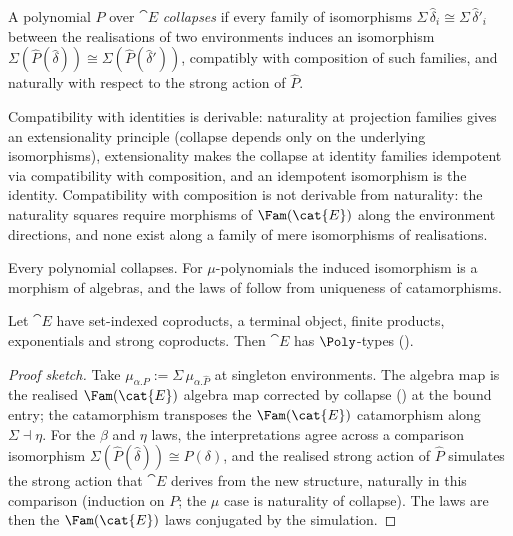 \begin{definition}[Collapse]
\label{def:conservativity:collapse}
A polynomial $P$ over $\cat{E}$ \emph{collapses} if every family of isomorphisms $\Sigma\,
\hat{\delta}_i \cong \Sigma\, \hat{\delta}'_i$ between the realisations of two environments
induces an isomorphism $\Sigma(\hat{P}(\hat{\delta})) \cong \Sigma(\hat{P}(\hat{\delta}'))$,
compatibly with composition of such families, and naturally with respect to the strong action of
$\hat{P}$.
\end{definition}

\begin{remark}
Compatibility with identities is derivable: naturality at projection families gives an
extensionality principle (collapse depends only on the underlying isomorphisms), extensionality
makes the collapse at identity families idempotent via compatibility with composition, and an
idempotent isomorphism is the identity. Compatibility with composition is not derivable from
naturality: the naturality squares require morphisms of $\Fam(\cat{E})$ along the environment
directions, and none exist along a family of mere isomorphisms of realisations.
\end{remark}

\begin{lemma}
\label{lem:conservativity:collapse}
Every polynomial collapses. For $\mu$-polynomials the induced isomorphism is a morphism of
algebras, and the laws of  follow from uniqueness of
catamorphisms.
\end{lemma}

\begin{theorem}[Transfer]
\label{thm:conservativity:transfer}
Let $\cat{E}$ have set-indexed coproducts, a terminal object, finite products, exponentials and
strong coproducts. Then $\cat{E}$ has $\Poly$-types ().
\end{theorem}

\begin{proof}[Proof sketch]
Take $\mu_{\alpha.P} := \Sigma\, \mu_{\alpha.\hat{P}}$ at singleton environments. The algebra
map is the realised $\Fam(\cat{E})$ algebra map corrected by collapse
() at the bound entry; the catamorphism transposes the
$\Fam(\cat{E})$ catamorphism along $\Sigma \dashv \eta$. For the $\beta$ and $\eta$ laws, the
interpretations agree across a comparison isomorphism $\Sigma(\hat{P}(\hat{\delta})) \cong
P(\delta)$, and the realised strong action of $\hat{P}$ simulates the strong action that $\cat{E}$
derives from the new structure, naturally in this comparison (induction on $P$; the $\mu$ case is
naturality of collapse). The laws are then the $\Fam(\cat{E})$ laws conjugated by the simulation.
\end{proof}

